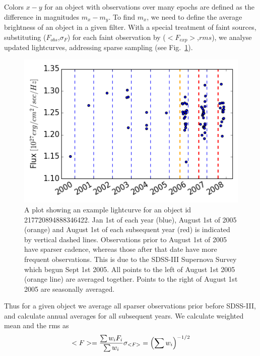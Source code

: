 \documentclass[fleqn,usenatbib]{mnras}  %
\begin{document}
Colors $x-y$ for an object with observations over many epochs are defined as the difference in magnitudes $m_{x} - m_{y}$. To find $m_{x}$, we need to define the average brightness of an object in  a given filter. With a special treatment of faint sources, substituting ($F_{obs}$,$\sigma_F$) for each faint observation by ($<F_{exp}>$,$rms$), we analyse updated lightcurves, addressing sparse sampling (see Fig.~\ref{fig:lc_example}).  

\begin{figure}
\label{fig:lc_example}
 \includegraphics[width=\columnwidth]{Lightcurve_full_obj_217720894888346422.png}
 \cprotect\caption{A plot showing an example lightcurve for an object id 217720894888346422. Jan 1st of each year (blue),  August 1st of 2005 (orange) and August 1st of each subsequent year (red) is indicated by vertical dashed lines. Observations prior to August 1st of 2005 have sparser cadence, whereas those after that date have more frequent observations.  This is due to the SDSS-III Supernova Survey which begun  Sept 1st 2005.  All points to the left of August 1st 2005 (orange line) are averaged together.  Points to the right of August 1st 2005 are seasonally averaged. }
\end{figure}

Thus for a given object we average all sparser observations prior before SDSS-III, and calculate annual averages for all subsequent years. We calculate weighted mean and the rms as 
\begin{equation}
<F> = \frac{\sum {w_{i}F_{i}}}{\sum{w_{i}}} \\
\sigma_{<F>} = \left( \sum{w_{i}}\right) ^{-1/2} 
\end{equation}
\end{document}

